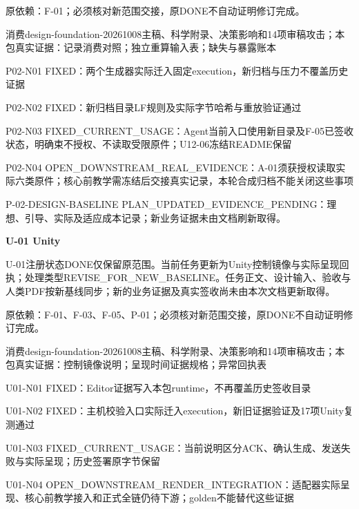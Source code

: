 \documentclass[11pt,a4paper]{article}
\newcommand{\reviewsection}[1]{\par\Needspace{5\baselineskip}\vspace{10pt}\begin{center}{\titlelatin\titlecjk\bfseries\fontsize{14}{20}\selectfont #1}\end{center}}
\begin{document}
原依赖：F-\allowbreak{}01；必须核对新范围交接，原DONE不自动证明修订完成。


消费design-\allowbreak{}foundation-\allowbreak{}20261008主稿、科学附录、决策影响和14项审稿攻击；本包真实证据：记录消费对照；独立重算输入表；缺失与暴露账本


P02-\allowbreak{}N01 FIXED：两个生成器实际迁入固定execution，新归档与压力不覆盖历史证据


P02-\allowbreak{}N02 FIXED：新归档目录LF规则及实际字节哈希与重放验证通过


P02-\allowbreak{}N03 FIXED\_\allowbreak{}CURRENT\_\allowbreak{}USAGE：Agent当前入口使用新目录及F-\allowbreak{}05已签收状态，明确束不授权、不读取受限原件；U12-\allowbreak{}06冻结README保留


P02-\allowbreak{}N04 OPEN\_\allowbreak{}DOWNSTREAM\_\allowbreak{}REAL\_\allowbreak{}EVIDENCE：A-\allowbreak{}01须获授权读取实际六类原件；核心前教学需冻结后交接真实记录，本轮合成归档不能关闭这些事项


P-\allowbreak{}02-\allowbreak{}DESIGN-\allowbreak{}BASELINE PLAN\_\allowbreak{}UPDATED\_\allowbreak{}EVIDENCE\_\allowbreak{}PENDING：理想、引导、实际及适应成本记录；新业务证据未由文档刷新取得。


\reviewsection{U-\allowbreak{}01 Unity}
U-\allowbreak{}01注册状态DONE仅保留原范围。当前任务更新为Unity控制镜像与实际呈现回执；处理类型REVISE\_\allowbreak{}FOR\_\allowbreak{}NEW\_\allowbreak{}BASELINE。任务正文、设计输入、验收与人类PDF按新基线同步；新的业务证据及真实签收尚未由本次文档更新取得。


原依赖：F-\allowbreak{}01、F-\allowbreak{}03、F-\allowbreak{}05、P-\allowbreak{}01；必须核对新范围交接，原DONE不自动证明修订完成。


消费design-\allowbreak{}foundation-\allowbreak{}20261008主稿、科学附录、决策影响和14项审稿攻击；本包真实证据：控制镜像说明；呈现时间证据规格；异常回执表


U01-\allowbreak{}N01 FIXED：Editor证据写入本包runtime，不再覆盖历史签收目录


U01-\allowbreak{}N02 FIXED：主机校验入口实际迁入execution，新旧证据验证及17项Unity复测通过


U01-\allowbreak{}N03 FIXED\_\allowbreak{}CURRENT\_\allowbreak{}USAGE：当前说明区分ACK、确认生成、发送失败与实际呈现；历史签署原字节保留


U01-\allowbreak{}N04 OPEN\_\allowbreak{}DOWNSTREAM\_\allowbreak{}RENDER\_\allowbreak{}INTEGRATION：适配器实际呈现、核心前教学接入和正式全链仍待下游；golden不能替代这些证据
\end{document}
